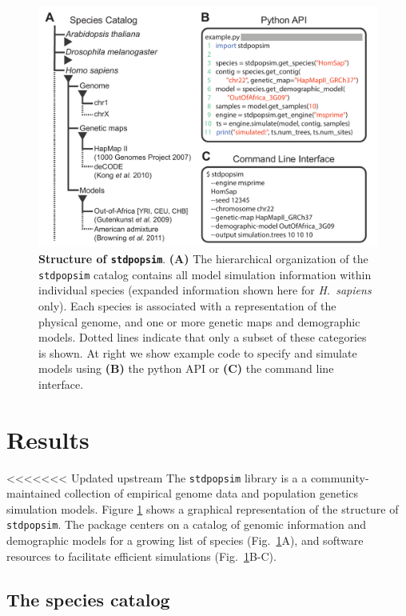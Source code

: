 \documentclass[12pt,halfline,a4paper]{ouparticle}
\newcommand{\stdpopsim}{\texttt{stdpopsim}\xspace}
\begin{document}
\begin{figure}[t]
\begin{center}
\includegraphics[width=0.7\linewidth]{display_items/Figure1.pdf}
    \caption{\textbf{Structure of \stdpopsim}. \textbf{(A)} The
hierarchical organization of the \stdpopsim catalog contains all model simulation information
within individual species (expanded information shown here for \textit{H.~sapiens} only).
Each species is associated with a representation of the physical genome, and one or more genetic maps and demographic models.
Dotted lines indicate that only a subset of these categories is shown.
At right we show example code to specify
and simulate models using \textbf{(B)} the python API or \textbf{(C)} the command line interface.
    }
\label{fig:cartoon}
\end{center}
\end{figure}

\section*{Results}

<<<<<<< Updated upstream
The \stdpopsim library is a
a community-maintained collection of empirical genome data and population genetics simulation models.
Figure \ref{fig:cartoon} shows a graphical representation of the structure of \stdpopsim.
The package centers on a catalog of genomic information and demographic models
for a growing list of species (Fig.~\ref{fig:cartoon}A), 
and software resources to facilitate efficient simulations (Fig.~\ref{fig:cartoon}B-C).

\subsection*{The species catalog}
\end{document}
